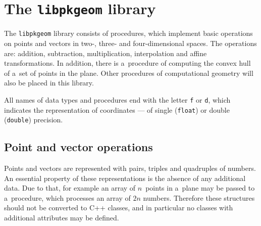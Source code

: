 

\chapter{The \texttt{libpkgeom} library}

The \texttt{libpkgeom} library consists of procedures, which implement basic
operations on points and vectors in two-, three- and four-dimensional
spaces. The operations are: addition, subtraction, multiplication,
interpolation and affine transformations. In addition, there is a~procedure
of computing the convex hull of a~set of points in the plane. Other
procedures of computational geometry will also be placed in this library.

All names of data types and procedures end with the letter \texttt{f} or
\texttt{d}, which indicates the representation of coordinates --- of single
(\texttt{float}) or double (\texttt{double}) precision.

\section{Point and vector operations}

\hspace*{\parindent}%
Points and vectors are represented with pairs, triples and quadruples
of numbers. An essential property of these representations is the absence
of any additional data. Due to that, for example an array of $n$~points
in a~plane may be passed to a~procedure, which processes an array
of $2n$ numbers. Therefore these structures should not be converted to
C++ classes, and in particular no classes with additional attributes
may be defined.


